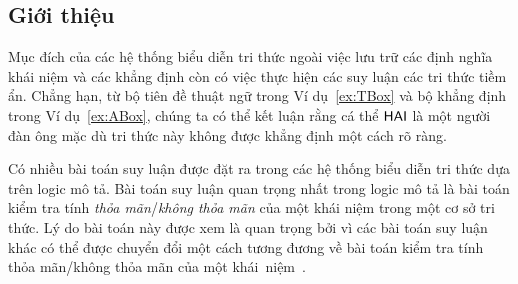\subsection{Giới thiệu}
\label{sec:Chap1.ReasoningIntroduction}
Mục đích của các hệ thống biểu diễn tri thức ngoài việc lưu trữ các định nghĩa khái niệm và các khẳng định còn có việc thực hiện các suy luận các tri thức tiềm ẩn. Chẳng hạn, từ bộ tiên đề thuật ngữ trong Ví dụ~\ref{ex:TBox} và bộ khẳng định trong Ví dụ~\ref{ex:ABox}, chúng ta có thể kết luận rằng cá thể $\mathsf{HAI}$ là một người đàn ông mặc dù tri thức này không được khẳng định một cách rõ ràng.

Có nhiều bài toán suy luận được đặt ra trong các hệ thống biểu diễn tri thức dựa trên logic mô tả. Bài toán suy luận quan trọng nhất trong logic mô tả là bài toán kiểm tra tính {\em thỏa mãn}/{\em không thỏa mãn} của một khái niệm trong một cơ sở tri thức. Lý do bài toán này được xem là quan trọng bởi vì các bài toán suy luận khác có thể được chuyển đổi một cách tương đương về bài toán kiểm tra tính thỏa mãn/không thỏa mãn của một khái~niệm~\cite{DLHandbook2007}.

%
%
%
%
%
%

